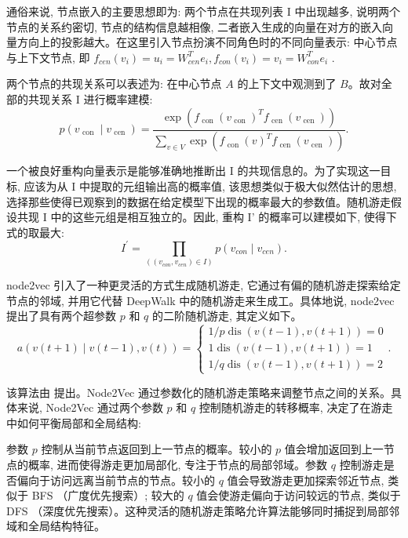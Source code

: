 通俗来说, 节点嵌入的主要思想即为: 两个节点在共现列表 I 中出现越多, 说明两个节点的关系约密切, 节点的结构信息越相像, 二者嵌入生成的向量在对方的嵌入向量方向上的投影越大。在这里引入节点扮演不同角色时的不同向量表示: 中心节点与上下文节点, 即 \({{f}}_{{{cen}}}\left( {{v}}_{{i}}\right)  = {{u}}_{{i}} = {{W}}_{{{cen}}}^{{T}}{{e}}_{{i}}, {{f}}_{{{con}}}\left( {{v}}_{{i}}\right)  = {{v}}_{{i}} = {{W}}_{{{con}}}^{{T}}{{e}}_{{i}}\) .

两个节点的共现关系可以表述为: 在中心节点 \({A}\) 的上下文中观测到了 \({B}\)。故对全部的共现关系 I 进行概率建模:
\[
p\left( {{v}_{\text{ con }} \mid  {v}_{\text{ cen }}}\right)  = \frac{\exp \left( {{f}_{\text{ con }}{\left( {v}_{\text{ con }}\right) }^{T}{f}_{\text{ cen }}\left( {v}_{\text{ cen }}\right) }\right) }{\mathop{\sum }\limits_{{v \in  V}}\exp \left( {{f}_{\text{ con }}{\left( v\right) }^{T}{f}_{\text{ cen }}\left( {v}_{\text{ cen }}\right) }\right) }.
\]

一个被良好重构向量表示是能够准确地推断出 I 的共现信息的。为了实现这一目标, 应该为从 I 中提取的元组输出高的概率值, 该思想类似于极大似然估计的思想, 选择那些使得已观察到的数据在给定模型下出现的概率最大的参数值。随机游走假设共现 I 中的这些元组是相互独立的。因此, 重构 I' 的概率可以建模如下, 使得下式的取最大:
\[
{{I}}^{\prime } = \mathop{\prod }\limits_{\left( \left( {{v}}_{{{con}}}, {{v}}_{{{cen}}}\right)  \in  {I}\right) }{p}\left( {{{v}}_{{{con}}} \mid  {{v}}_{{{cen}}}}\right).
\]

node2vec 引入了一种更灵活的方式生成随机游走, 它通过有偏的随机游走探索给定节点的邻域, 并用它代替 DeepWalk 中的随机游走来生成工。具体地说, node2vec 提出了具有两个超参数 \({p}\) 和 \({q}\) 的二阶随机游走, 其定义如下。
\[
a\left( {v\left( {t + 1}\right)  \mid  v\left( {t - 1}\right) , v\left( t\right) }\right)  = \left\{  \begin{matrix} 1/p\operatorname{dis}\left( {v\left( {t - 1}\right) , v\left( {t + 1}\right) }\right)  = 0 \\  1\operatorname{dis}\left( {v\left( {t - 1}\right) , v\left( {t + 1}\right) }\right)  = 1 \\  1/q\operatorname{dis}\left( {v\left( {t - 1}\right) , v\left( {t + 1}\right) }\right)  = 2 \end{matrix}\right. .
\]

该算法由 \textcite{2016_grover_node2vec} 提出。Node2Vec 通过参数化的随机游走策略来调整节点之间的关系。具体来说, Node2Vec 通过两个参数 \({p}\) 和 \({q}\) 控制随机游走的转移概率, 决定了在游走中如何平衡局部和全局结构:

参数 \({p}\) 控制从当前节点返回到上一节点的概率。较小的 \({p}\) 值会增加返回到上一节点的概率, 进而使得游走更加局部化, 专注于节点的局部邻域。参数 \({q}\) 控制游走是否偏向于访问远离当前节点的节点。较小的 \({q}\) 值会导致游走更加探索邻近节点, 类似于 BFS （广度优先搜索）; 较大的 $q$ 值会使游走偏向于访问较远的节点, 类似于 DFS （深度优先搜索）。这种灵活的随机游走策略允许算法能够同时捕捉到局部邻域和全局结构特征。

